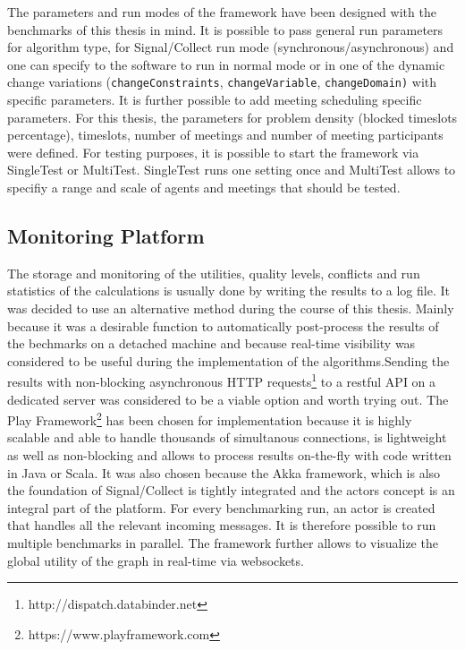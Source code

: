\newline \newline
The parameters and run modes of the framework have been designed with the benchmarks of this thesis in mind.  It is possible to pass general run parameters for algorithm type, for Signal/Collect run mode (synchronous/asynchronous) and one can specify to the software to run in normal mode or in one of the dynamic change variations (\texttt{changeConstraints}, \texttt{changeVariable}, \texttt{changeDomain)} with specific parameters.  It is further possible to add meeting scheduling specific parameters. For this thesis, the parameters for problem density (blocked timeslots percentage), timeslots, number of meetings and number of meeting participants were defined. For testing purposes, it is possible to start the framework via SingleTest or MultiTest. SingleTest runs one setting once and MultiTest allows to specifiy a range and scale of agents and meetings that should be tested.

\subsection{Monitoring Platform}
The  storage and monitoring of the utilities, quality levels, conflicts and run statistics of the calculations is usually done by writing the results to a log file. It was decided to use an alternative method during the course of this thesis. Mainly because it was a desirable function  to automatically post-process the results of the bechmarks on a detached machine and because real-time visibility was considered to be useful during the implementation of the algorithms.\newline Sending the results with non-blocking asynchronous HTTP requests\footnote{http://dispatch.databinder.net} to a restful API on a dedicated server was considered to be a viable option and worth trying out. The Play Framework\footnote{https://www.playframework.com} has been chosen for implementation because it is highly scalable and able to handle thousands of simultanous connections, is lightweight as well as non-blocking and allows to process results on-the-fly with code written in Java or Scala. It was also chosen because the Akka framework, which is also the foundation of Signal/Collect is tightly integrated and the actors concept is an integral part of the platform. For every benchmarking run, an actor is created that handles all the relevant incoming messages. It is therefore possible to run multiple benchmarks in parallel. The framework further allows to visualize the global utility of the graph in real-time via websockets.

